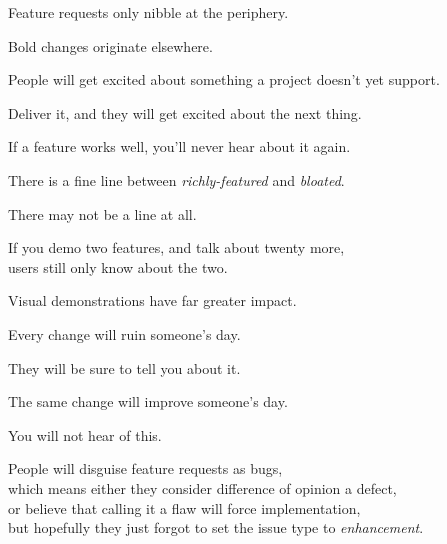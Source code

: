 \documentclass[t,handout,aspectratio=169]{beamer}
\begin{document}
\begin{frame}[fragile] %
    \vfill
    Feature requests only nibble at the periphery. \pause

    Bold changes originate elsewhere.
\end{frame}

\begin{frame}[fragile]%
    \vfill
    People will get excited about something a project doesn't yet support. \pause

    Deliver it, and they will get excited about the next thing.
\end{frame}

\begin{frame}[fragile]%
    \vfill
    If a feature works well, you'll never hear about it again.
\end{frame}

\begin{frame}[fragile]%
    \vfill
    There is a fine line between \textit{richly-featured} and \textit{bloated}. \pause

    There may not be a line at all.
\end{frame}

\begin{frame}[fragile]%
    \vfill
    If you demo two features, and talk about twenty more, \\
    users still only know about the two. \pause

    Visual demonstrations have far greater impact.
\end{frame}

\begin{frame}[fragile]%
    \vfill
    Every change will ruin someone's day.

    They will be sure to tell you about it. \pause

    The same change will improve someone's day.

    You will not hear of this.
\end{frame}

\begin{frame}[fragile]%
    \vfill
    People will disguise feature requests as bugs, \pause \\
    which means either they consider difference of opinion a defect, \pause \\
    or believe that calling it a flaw will force implementation, \pause \\
    but hopefully they just forgot to set the issue type to \textit{enhancement}.
\end{frame}
\end{document}
